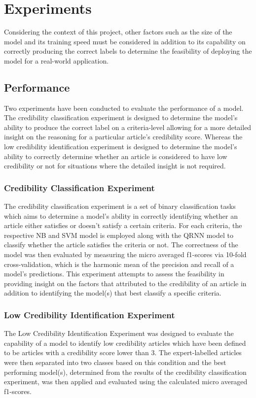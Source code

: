 \documentclass[a4paper,twoside,phd]{BYUPhys}
\begin{document}
\section{Experiments}
\label{sec:Experiments}

Considering the context of this project, other factors such as the size of the model and its training speed must be considered in addition to its capability on correctly producing the correct labels to determine the feasibility of deploying the model for a real-world application. 

\subsection{Performance}
\label{sec:PerformanceExperiments}

Two experiments have been conducted to evaluate the performance of a model. The credibility classification experiment is designed to determine the model's ability to produce the correct label on a criteria-level allowing for a more detailed insight on the reasoning for a particular article's credibility score. Whereas the low credibility identification experiment is designed to determine the model's ability to correctly determine whether an article is considered to have low credibility or not for situations where the detailed insight is not required.

\subsubsection{Credibility Classification Experiment}
\label{sec:CredibilityClassificationExperiment}
The credibility classification experiment is a set of binary classification tasks which aims to determine a model's ability in correctly identifying whether an article either satisfies or doesn't satisfy a certain criteria. 
For each criteria, the respective NB and SVM model is employed along with the QRNN model to classify whether the article satisfies the criteria or not. The correctness of the model was then evaluated by measuring the micro averaged f1-scores via 10-fold cross-validation, which is the harmonic mean of the precision and recall of a model's predictions. This experiment attempts to assess the feasibility in providing insight on the factors that attributed to the credibility of an article in addition to identifying the model(s) that best classify a specific criteria.


\subsubsection{Low Credibility Identification Experiment}
\label{sec:LowCredibilityIdentification}
The Low Credibility Identification Experiment was designed to evaluate the capability of a model to identify low credibility articles which have been defined to be articles with a credibility score lower than 3. The expert-labelled articles were then separated into two  classes based on this condition and the best performing model(s), determined from the results of the credibility classification experiment, was then applied and evaluated using the calculated micro averaged f1-scores. 
\end{document}
